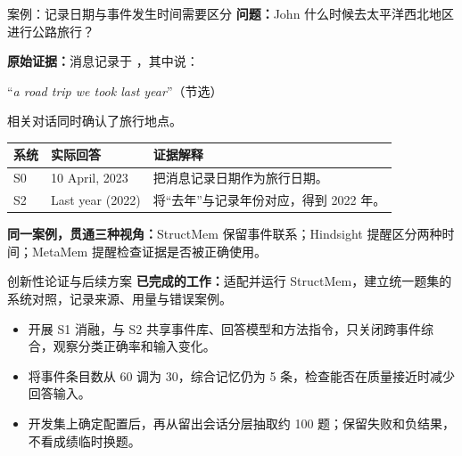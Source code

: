 \documentclass[aspectratio=169,10pt]{beamer}
\begin{document}
\begin{frame}[t]{案例：记录日期与事件发生时间需要区分}
  \vspace{1mm}
  \textbf{问题：}John 什么时候去太平洋西北地区进行公路旅行？\par
  \vspace{1.5mm}
  \textbf{原始证据：}消息记录于 ，其中说：\par
  \vspace{1mm}
  \hspace{4mm}“\textit{a road trip we took last year}”\quad（节选）\par
  {\small\hspace{4mm}相关对话同时确认了旅行地点。}\par
  \vspace{4mm}
  \begin{tabularx}{\linewidth}{@{}p{14mm}p{43mm}Y@{}}
    \toprule 系统 & 实际回答 & 证据解释\\\midrule
    S0 & 10 April, 2023 & 把消息记录日期作为旅行日期。\\[1.5mm]
    S2 & Last year (2022) & 将“去年”与记录年份对应，得到 2022 年。\\
    \bottomrule
  \end{tabularx}\par
  \vspace{4mm}
  \textbf{同一案例，贯通三种视角：}StructMem 保留事件联系；Hindsight 提醒区分两种时间；MetaMem 提醒检查证据是否被正确使用。\par
\end{frame}

\begin{frame}[t]{创新性论证与后续方案}
  \vspace{1mm}
  \textbf{已完成的工作：}适配并运行 StructMem，建立统一题集的系统对照，记录来源、用量与错误案例。\par
  \vspace{3mm}
  \begin{itemize}\setlength{\itemsep}{2.3mm}
    \item {}开展 S1 消融，与 S2 共享事件库、回答模型和方法指令，只关闭跨事件综合，观察分类正确率和输入变化。
    \item {}将事件条目数从 60 调为 30，综合记忆仍为 5 条，检查能否在质量接近时减少回答输入。
    \item {}开发集上确定配置后，再从留出会话分层抽取约 100 题；保留失败和负结果，不看成绩临时换题。
  \end{itemize}
\end{frame}
\end{document}
